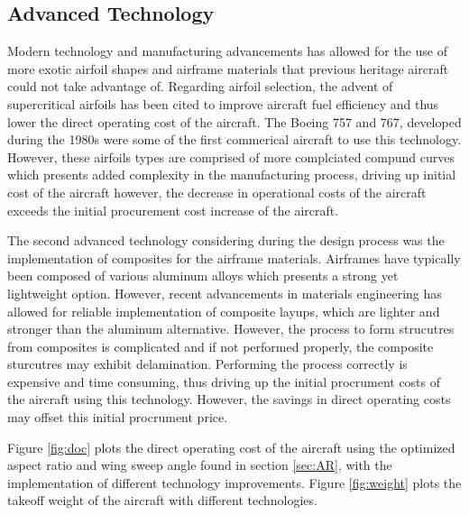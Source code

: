 \documentclass{article}
\begin{document}
    \subsection{Advanced Technology}
    \label{sec:adv_tech}
        \begin{flushleft}
            Modern technology and manufacturing advancements has allowed for the
            use of more exotic airfoil shapes and airframe materials that
            previous heritage aircraft could not take advantage of. Regarding
            airfoil selection, the advent of supercritical airfoils has been
            cited to improve aircraft fuel efficiency and thus lower the direct
            operating cost of the aircraft. The Boeing 757 and 767, developed
            during the 1980s were some of the first commerical aircraft to use
            this technology. However, these airfoils types are comprised of more
            complciated compund curves which presents added complexity in the
            manufacturing process, driving up initial cost of the aircraft
            however, the decrease in operational costs of the aircraft exceeds
            the initial procurement cost increase of the aircraft.

            The second advanced technology considering during the design process
            was the implementation of composites for the airframe materials.
            Airframes have typically been composed of various aluminum alloys
            which presents a strong yet lightweight option. However, recent
            advancements in materials engineering has allowed for reliable
            implementation of composite layups, which are lighter and stronger
            than the aluminum alternative. However, the process to form
            strucutres from composites is complicated and if not performed
            properly, the composite sturcutres may exhibit delamination.
            Performing the process correctly is expensive and time consuming,
            thus driving up the initial procrument costs of the aircraft using
            this technology. However, the savings in direct operating costs may
            offset this initial procrument price.

            Figure \ref{fig:doc} plots the direct operating cost of the aircraft
            using the optimized aspect ratio and wing sweep angle found in
            section \ref{sec:AR}, with the implementation of different
            technology improvements. Figure \ref{fig:weight} plots the takeoff weight of
            the aircraft with different technologies.


\end{flushleft}
\end{document}
